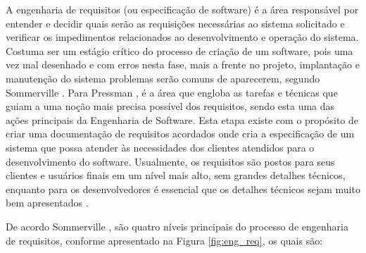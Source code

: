 A engenharia de requisitos (ou especificação de software) é a área responsável por entender e decidir quais serão as requisições necessárias ao sistema solicitado e verificar os impedimentos relacionados ao desenvolvimento e operação do sistema. Costuma ser um estágio crítico do processo de criação de um software, pois uma vez mal desenhado e com erros nesta fase, mais a frente no projeto, implantação e manutenção do sistema problemas serão comuns de aparecerem, segundo Sommerville \cite{Sommerville07}. Para Pressman \cite{pressman}, é a área que engloba as tarefas e técnicas que guiam a uma noção mais precisa possível dos requisitos, sendo esta uma das ações principais da Engenharia de Software. 
Esta etapa existe com o propósito de criar uma documentação de requisitos acordados onde cria a especificação de um sistema que possa atender às necessidades dos clientes atendidos para o desenvolvimento do software. Usualmente, os requisitos são postos para seus clientes e usuários finais em um nível mais alto, sem grandes detalhes técnicos, enquanto para os desenvolvedores é essencial que os detalhes técnicos sejam muito bem apresentados \cite{Sommerville07}.

De acordo Sommerville \cite{Sommerville07}, são quatro níveis principais do processo de engenharia de requisitos, conforme apresentado na Figura \ref{fig:eng_req}, os quais são:

